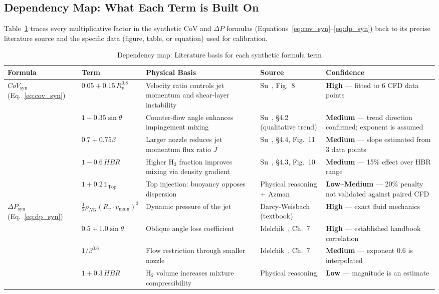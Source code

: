 \documentclass[12pt, a4paper]{report}
\begin{document}
\subsection{Dependency Map: What Each Term is Built On}

Table~\ref{tab:dependency_map} traces every multiplicative factor in the synthetic CoV and $\Delta P$ formulas (Equations~\ref{eq:cov_syn}--\ref{eq:dp_syn}) back to its precise literature source and the specific data (figure, table, or equation) used for calibration.

\begin{table}[H]
\centering
\caption{Dependency map: Literature basis for each synthetic formula term}
\label{tab:dependency_map}
\begin{tabular}{@{}p{2.0cm}p{3.2cm}p{3.2cm}p{2.5cm}p{3.0cm}@{}}
\toprule
\textbf{Formula} & \textbf{Term} & \textbf{Physical Basis} & \textbf{Source} & \textbf{Confidence} \\ \midrule

\multirow{5}{*}{\parbox{2.0cm}{$CoV_{\text{syn}}$ (Eq.~\ref{eq:cov_syn})}}
 & $0.05 + 0.15\,R_v^{0.8}$ & Velocity ratio controls jet momentum and shear-layer instability & Su~\cite{Su2022}, Fig.~8 & \textbf{High} --- fitted to 6 CFD data points \\
 & $1 - 0.35\sin\theta$ & Counter-flow angle enhances impingement mixing & Su~\cite{Su2022}, \S4.2 (qualitative trend) & \textbf{Medium} --- trend direction confirmed; exponent is assumed \\
 & $0.7 + 0.75\beta$ & Larger nozzle reduces jet momentum flux ratio $J$ & Su~\cite{Su2022}, \S4.4, Fig.~11 & \textbf{Medium} --- slope estimated from 3 data points \\
 & $1 - 0.6\,HBR$ & Higher H$_2$ fraction improves mixing via density gradient & Su~\cite{Su2022}, \S4.3, Fig.~10 & \textbf{Medium} --- 15\% effect over HBR range \\
 & $1 + 0.2\,\mathbb{1}_{\text{Top}}$ & Top injection: buoyancy opposes dispersion & Physical reasoning + Azman~\cite{Azman2025} & \textbf{Low--Medium} --- 20\% penalty not validated against paired CFD \\ \midrule

\multirow{4}{*}{\parbox{2.0cm}{$\Delta P_{\text{syn}}$ (Eq.~\ref{eq:dp_syn})}}
 & $\frac{1}{2}\rho_{NG}(R_v \cdot v_{\text{main}})^2$ & Dynamic pressure of the jet & Darcy-Weisbach (textbook) & \textbf{High} --- exact fluid mechanics \\
 & $0.5 + 1.0\sin\theta$ & Oblique angle loss coefficient & Idelchik~\cite{Idelchik1994}, Ch.~7 & \textbf{High} --- established handbook correlation \\
 & $1 / \beta^{0.6}$ & Flow restriction through smaller nozzle & Idelchik~\cite{Idelchik1994}, Ch.~7 & \textbf{Medium} --- exponent 0.6 is interpolated \\
 & $1 + 0.3\,HBR$ & H$_2$ volume increases mixture compressibility & Physical reasoning & \textbf{Low} --- magnitude is an estimate \\
\bottomrule
\end{tabular}
\end{table}
\end{document}
